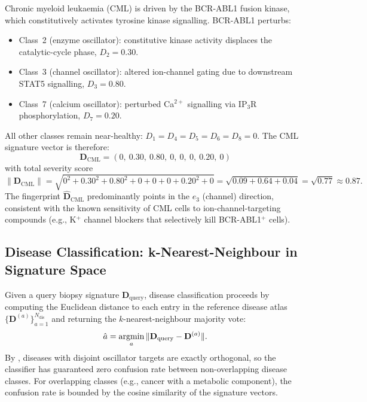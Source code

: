 Chronic myeloid leukaemia (CML) is driven by the BCR-ABL1 fusion kinase,
which constitutively activates tyrosine kinase signalling.  BCR-ABL1
perturbs:
\begin{itemize}[noitemsep]
    \item Class~2 (enzyme oscillator): constitutive kinase activity
          displaces the catalytic-cycle phase, $D_2 = 0.30$.
    \item Class~3 (channel oscillator): altered ion-channel gating due to
          downstream STAT5 signalling, $D_3 = 0.80$.
    \item Class~7 (calcium oscillator): perturbed Ca$^{2+}$ signalling via
          IP$_3$R phosphorylation, $D_7 = 0.20$.
\end{itemize}
All other classes remain near-healthy: $D_1 = D_4 = D_5 = D_6 = D_8 = 0$.
The CML signature vector is therefore:
\begin{equation}
\label{eq:ch04-cml-signature}
    \mathbf{D}_{\mathrm{CML}} = (0,\ 0.30,\ 0.80,\ 0,\ 0,\ 0,\ 0.20,\ 0)
\end{equation}
with total severity score
\begin{equation}
    \|\mathbf{D}_{\mathrm{CML}}\|
        = \sqrt{0^2 + 0.30^2 + 0.80^2 + 0 + 0 + 0 + 0.20^2 + 0}
        = \sqrt{0.09 + 0.64 + 0.04}
        = \sqrt{0.77} \approx 0.87.
\end{equation}
The fingerprint $\hat{\mathbf{D}}_{\mathrm{CML}}$ predominantly points in
the $e_3$ (channel) direction, consistent with the known sensitivity of
CML cells to ion-channel-targeting compounds (e.g., K$^+$ channel blockers
that selectively kill BCR-ABL1$^+$ cells).

\subsection{Disease Classification: k-Nearest-Neighbour in Signature Space}

Given a query biopsy signature $\mathbf{D}_{\mathrm{query}}$, disease
classification proceeds by computing the Euclidean distance to each entry
in the reference disease atlas $\{\mathbf{D}^{(a)}\}_{a=1}^{N_{\mathrm{dis}}}$
and returning the $k$-nearest-neighbour majority vote:
\begin{equation}
\label{eq:ch04-knn}
    \hat{a} = \operatorname*{argmin}_{a} \|\mathbf{D}_{\mathrm{query}} - \mathbf{D}^{(a)}\|.
\end{equation}
By , diseases with disjoint oscillator
targets are exactly orthogonal, so the classifier has guaranteed zero
confusion rate between non-overlapping disease classes.  For overlapping
classes (e.g., cancer with a metabolic component), the confusion rate is
bounded by the cosine similarity of the signature vectors.

